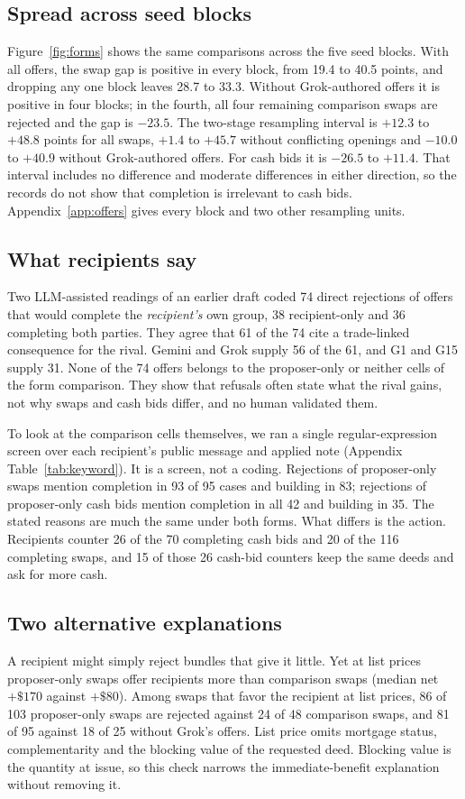 \subsection{Spread across seed blocks}
Figure~\ref{fig:forms} shows the same comparisons across the five seed blocks. With all offers, the swap gap is positive in every block, from 19.4 to 40.5 points, and dropping any one block leaves 28.7 to 33.3. Without Grok-authored offers it is positive in four blocks; in the fourth, all four remaining comparison swaps are rejected and the gap is $-23.5$. The two-stage resampling interval is $+12.3$ to $+48.8$ points for all swaps, $+1.4$ to $+45.7$ without conflicting openings and $-10.0$ to $+40.9$ without Grok-authored offers. For cash bids it is $-26.5$ to $+11.4$. That interval includes no difference and moderate differences in either direction, so the records do not show that completion is irrelevant to cash bids. Appendix~\ref{app:offers} gives every block and two other resampling units.

\subsection{What recipients say}
Two LLM-assisted readings of an earlier draft coded 74 direct rejections of offers that would complete the \emph{recipient's} own group, 38 recipient-only and 36 completing both parties. They agree that 61 of the 74 cite a trade-linked consequence for the rival. Gemini and Grok supply 56 of the 61, and G1 and G15 supply 31. None of the 74 offers belongs to the proposer-only or neither cells of the form comparison. They show that refusals often state what the rival gains, not why swaps and cash bids differ, and no human validated them.

To look at the comparison cells themselves, we ran a single regular-expression screen over each recipient's public message and applied note (Appendix Table~\ref{tab:keyword}). It is a screen, not a coding. Rejections of proposer-only swaps mention completion in 93 of 95 cases and building in 83; rejections of proposer-only cash bids mention completion in all 42 and building in 35. The stated reasons are much the same under both forms. What differs is the action. Recipients counter 26 of the 70 completing cash bids and 20 of the 116 completing swaps, and 15 of those 26 cash-bid counters keep the same deeds and ask for more cash.

\subsection{Two alternative explanations}
A recipient might simply reject bundles that give it little. Yet at list prices proposer-only swaps offer recipients more than comparison swaps (median net $+\$170$ against $+\$80$). Among swaps that favor the recipient at list prices, 86 of 103 proposer-only swaps are rejected against 24 of 48 comparison swaps, and 81 of 95 against 18 of 25 without Grok's offers. List price omits mortgage status, complementarity and the blocking value of the requested deed. Blocking value is the quantity at issue, so this check narrows the immediate-benefit explanation without removing it.

